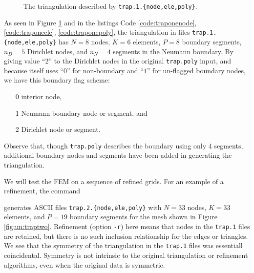 \begin{figure}

\caption{The triangulation described by \texttt{trap.1.\{node,ele,poly\}}.}
\label{fig:un:trapone}
\end{figure}



As seen in Figure \ref{fig:un:trapone} and in the listings Code \ref{code:traponenode}, \ref{code:traponeele}, \ref{code:traponepoly}, the triangulation in files \texttt{trap.1.\{node,ele,poly\}} has $N=8$ nodes, $K=6$ elements, $P=8$ boundary segments, $n_D=5$ Dirichlet nodes, and $n_N=4$ segments in the Neumann boundary.  By giving value ``$2$'' to the Dirichlet nodes in the original \texttt{trap.poly} input, and because \Triangle itself uses ``$0$'' for non-boundary and ``$1$'' for un-flagged boundary nodes, we have this boundary flag scheme:
\begin{itemize}
\item[0] interior node,
\item[1] Neumann boundary node or segment, and
\item[2] Dirichlet node or segment.
\end{itemize}
Observe that, though \texttt{trap.poly} describes the boundary using only 4 segments, additional boundary nodes and segments have been added in generating the triangulation.


We will test the FEM on a sequence of refined grids.  For an example of a refinement, the command
generates ASCII files \texttt{trap.2.\{node,ele,poly\}} with $N=33$ nodes, $K=33$ elements, and $P=19$ boundary segments for the mesh shown in Figure \ref{fig:un:traptwo}.  Refinement (option \texttt{-r}) here means that nodes in the \texttt{trap.1} files are retained, but there is no such inclusion relationship for the edges or triangles.  We see that the symmetry of the triangulation in the \texttt{trap.1} files was essentiall coincidental.  Symmetry is not intrinsic to the original triangulation or refinement algorithms, even when the original data is symmetric.

